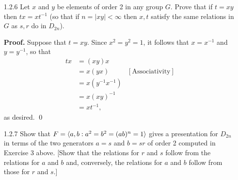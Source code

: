 \begin{enumerate}
      \textbf{Proof.} Let $n$ be an odd integer such that $n \ge 3$. Suppose to
      the contrary that there exists a nonidentity $y \in D_{2n}$ that commutes
      with every other element of $D_{2n}$.
      
      \textbf{Case 1.} \textit{$y = r^i$, with $1 \le i < n$.} By Case 1 in
      Exercise 1.2.4, it follows that $i = k$, and this contradicts
      Exercise 1.1.33(a).
      
      
      \textbf{Case 2.} \textit{$y = sr^i$, with $0 \le i < n$.} By Case 2 in
      Exercise 1.2.4, we will arrive at a contradiction.

      We can now conclude that the identity is the only element of $D_{2n}$ 
      which commutes with all elements of $D_{2n}$. \qed

   \item[1.2.6]   Let $x$ and $y$ be elements of order 2 in any group $G$. Prove
                  that if $t = xy$ then $tx = xt^{-1}$ (so that if
                  $n = |xy| < \infty$ then $x, t$ satisfy the same relations in
                  $G$ as $s, r$ do in $D_{2n}$).

      \textbf{Proof.} Suppose that $t = xy$. Since $x^2 = y^2 = 1$, it follows 
      that $x = x^{-1}$ and $y = y^{-1}$, so that
      \begin{align*}
         tx &= (xy)x \\
            &= x(yx) &[\text{Associativity}] \\
            &= x(y^{-1}x^{-1}) \\
            &= x(xy)^{-1} \\
            &= xt^{-1},
      \end{align*}
      as desired. \qed
   \item[1.2.7]   Show that $F = \langle a, b : a^2 = b^2 = (ab)^n = 1 \rangle$ gives a
                  presentation for $D_{2n}$ in terms of the two generators
                  $a = s$ and $b = sr$ of order 2 computed in Exercise 3 above.
                  [Show that the relations for $r$ and $s$ follow from the
                  relations for $a$ and $b$ and, conversely, the relations for
                  $a$ and $b$ follow from those for $r$ and $s$.]
                  

\end{enumerate}
